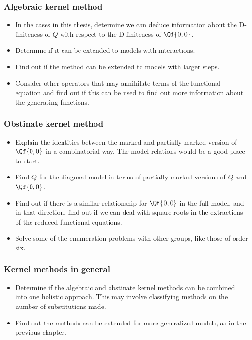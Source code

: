 \subsubsection{Algebraic kernel method}
\begin{itemize}
	\item In the cases in this thesis, determine we can deduce information about the D-finiteness of $Q$ with respect to the D-finiteness of $\Qf{0,0}$.
	\item Determine if it can be extended to \classic \highD models with interactions.
	\item Find out if the method can be extended to models with larger steps.
	\item Consider other operators that may annihilate terms of the functional equation and find out if this can be used to find out more information about the generating functions.
\end{itemize}

\subsubsection{Obstinate kernel method}
\begin{itemize}
	\item Explain the identities between the marked and partially-marked version of $\Qf{0,0}$ in a combinatorial way. The \oneD model relations would be a good place to start.
	\item Find $Q$ for the diagonal model in terms of partially-marked versions of $Q$ and $\Qf{0,0}$.
	\item Find out if there is a similar relationship for $\Qf{0,0}$ in the full model, and in that direction, find out if we can deal with square roots in the extractions of the reduced functional equations.
	\item Solve some of the enumeration problems with other groups, like those of order six.
\end{itemize}

\subsubsection{Kernel methods in general}
\begin{itemize}
	\item Determine if the algebraic and obstinate kernel methods can be combined into one holistic approach. This may involve classifying methods on the number of substitutions made.
	\item Find out the methods can be extended for more generalized models, as in the previous chapter.
\end{itemize}


